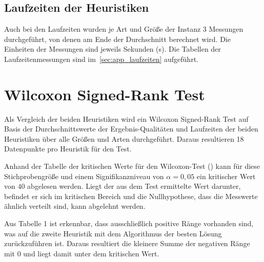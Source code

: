 \documentclass[a4paper, 10pt, twoside, onecolumn, parskip]{scrartcl}
\begin{document}
    \subsection{Laufzeiten der Heuristiken} \label{sec:laufzeiten}

    Auch bei den Laufzeiten wurden je Art und Größe der Instanz 3 Messungen durchgeführt, von denen am Ende der Durchschnitt berechnet wird.
    Die Einheiten der Messungen sind jeweils Sekunden (s).
    Die Tabellen der Laufzeitenmessungen sind im~\autoref{sec:app_laufzeiten} aufgeführt.

    \section{Wilcoxon Signed-Rank Test}

    Als Vergleich der beiden Heuristiken wird ein Wilcoxon Signed-Rank Test auf Basis der Durchschnittswerte der Ergebnis-Qualitäten und Laufzeiten der beiden Heuristiken über alle Größen und Arten durchgeführt.
    Daraus resultieren 18 Datenpunkte pro Heuristik für den Test.

    Anhand der Tabelle der kritischen Werte für den Wilcoxon-Test (\cite{wilcoxon_table}) kann für diese Stichprobengröße und einem Signifikanzniveau von $\alpha{} = 0,05$ ein kritischer Wert von $40$ abgelesen werden.
    Liegt der aus dem Test ermittelte Wert darunter, befindet er sich im kritischen Bereich und die Nullhypothese, dass die Messwerte ähnlich verteilt sind, kann abgelehnt werden.

    Aus Tabelle 1 ist erkennbar, dass ausschließlich positive Ränge vorhanden sind, was auf die zweite Heuristik mit dem Algorithmus der besten Lösung zurückzuführen ist.
    Daraus resultiert die kleinere Summe der negativen Ränge mit $0$ und liegt damit unter dem kritischen Wert.
\end{document}
